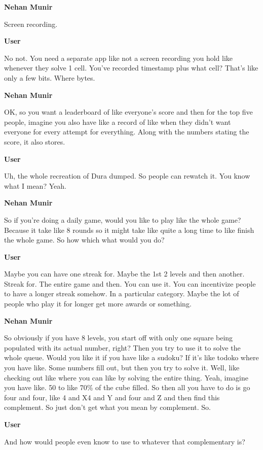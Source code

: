 \documentclass{article}
\begin{document}
\noindent \textbf{Nehan Munir}

Screen recording.

\noindent \textbf{User}

No not. You need a separate app like not a screen recording you hold like whenever they solve 1 cell. You've recorded timestamp plus what cell? That's like only a few bits. Where bytes.

\noindent \textbf{Nehan Munir}

OK, so you want a leaderboard of like everyone's score and then for the top five people, imagine you also have like a record of like when they didn't want everyone for every attempt for everything. Along with the numbers stating the score, it also stores.

\noindent \textbf{User}

Uh, the whole recreation of Dura dumped. So people can rewatch it. You know what I mean? Yeah.

\noindent \textbf{Nehan Munir}

So if you're doing a daily game, would you like to play like the whole game? Because it take like 8 rounds so it might take like quite a long time to like finish the whole game. So how which what would you do?

\noindent \textbf{User}

Maybe you can have one streak for. Maybe the 1st 2 levels and then another. Streak for. The entire game and then. You can use it. You can incentivize people to have a longer streak somehow. In a particular category. Maybe the lot of people who play it for longer get more awards or something.

\noindent \textbf{Nehan Munir}

So obviously if you have 8 levels, you start off with only one square being populated with its actual number, right? Then you try to use it to solve the whole queue. Would you like it if you have like a sudoku? If it's like todoko where you have like. Some numbers fill out, but then you try to solve it. Well, like checking out like where you can like by solving the entire thing. Yeah, imagine you have like. 50 to like 70\% of the cube filled. So then all you have to do is go four and four, like 4 and X4 and Y and four and Z and then find this complement. So just don't get what you mean by complement. So.

\noindent \textbf{User}

And how would people even know to use to whatever that complementary is?
\end{document}
